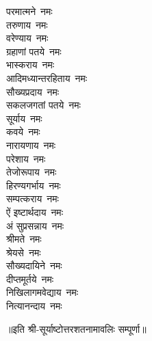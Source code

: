 \begin{multicols}{2}
\begin{flushleft}
परमात्मने~नमः\\
तरुणाय~नमः\\
वरेण्याय~नमः\\
ग्रहाणां पतये~नमः\\
भास्कराय~नमः\hfill{}\\
आदिमध्यान्तरहिताय~नमः\\
सौख्यप्रदाय~नमः\\
सकलजगतां पतये~नमः\\
सूर्याय~नमः\\
कवये~नमः\\
नारायणाय~नमः\\
परेशाय~नमः\\
तेजोरूपाय~नमः\\
हिरण्यगर्भाय~नमः\\
सम्पत्कराय~नमः\hfill{}\\
ऐं इष्टार्थदाय~नमः\\
अं सुप्रसन्नाय~नमः\\
श्रीमते~नमः\\
श्रेयसे~नमः\\
सौख्यदायिने~नमः\\
दीप्तमूर्तये~नमः\\
निखिलागमवेद्याय~नमः\\
नित्यानन्दाय~नमः\hfill{}\\
    \end{flushleft}
\end{multicols}
॥इति श्री-सूर्याष्टोत्तरशतनामावलिः सम्पूर्णा॥
